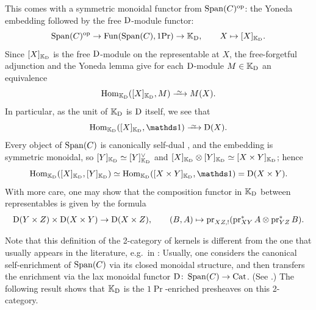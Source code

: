 \documentclass[11pt]{book}
\begin{document}
	This comes with a symmetric monoidal functor from $\operatorname{Span}(C)^{\textup{op}}$: the Yoneda embedding followed by the free $\operatorname{\mathrm{D}}$-module functor:
	\[
		\operatorname{Span}(C)^{\textup{op}} \to \operatorname{Fun}(\operatorname{Span}(C),1\textup{Pr}) \to \mathbb{K}_{\operatorname{\mathrm{D}}}, \qquad X \mapsto [X]_{\mathbb{K}_{\operatorname{\mathrm{D}}}}.
	\]
	Since $[X]_{\mathbb{K}_{\operatorname{\mathrm{D}}}}$ is the free $\operatorname{\mathrm{D}}$-module on the representable at $X$, the free-forgetful adjunction and the Yoneda lemma give for each $\operatorname{\mathrm{D}}$-module $M\in\mathbb{K}_{\operatorname{\mathrm{D}}}$ an equivalence
	\[
		\Hom_{\bbK_{\D}}([X]_{\bbK_{\D}}, M) \iso M(X).
	\]
	In particular, as the unit of $\mathbb{K}_{\operatorname{\mathrm{D}}}$ is $\operatorname{\mathrm{D}}$ itself, we see that
	\[
		\Hom_{\bbK_{\D}}([X]_{\bbK_{\D}}, \unit) \iso \D(X).
	\]
	Every object of $\operatorname{Span}(C)$ is canonically self-dual \citep[2.3.9]{Heyer_Mann}, and the embedding is symmetric monoidal, so $[Y]_{\mathbb{K}_{\operatorname{\mathrm{D}}}}\simeq[Y]_{\mathbb{K}_{\operatorname{\mathrm{D}}}}^{\vee}$ and $[X]_{\mathbb{K}_{\operatorname{\mathrm{D}}}}\otimes[Y]_{\mathbb{K}_{\operatorname{\mathrm{D}}}}\simeq[X\times Y]_{\mathbb{K}_{\operatorname{\mathrm{D}}}}$; hence
	\[
		\Hom_{\bbK_{\D}}([X]_{\bbK_{\D}}, [Y]_{\bbK_{\D}}) \simeq \Hom_{\bbK_{\D}}([X\times Y]_{\bbK_{\D}}, \unit) = \D(X\times Y).
	\]
	With more care, one may show that the composition functor in $\mathbb{K}_{\operatorname{\mathrm{D}}}$ between representables is given by the formula
	\[
		\operatorname{\mathrm{D}}(Y \times Z) \times \operatorname{\mathrm{D}}(X \times Y) \to \operatorname{\mathrm{D}}(X \times Z), \qquad (B, A) \mapsto \operatorname{pr}_{XZ,!}(\operatorname{pr}_{XY}^*A \otimes \operatorname{pr}_{YZ}^*B).
	\]

	Note that this definition of the 2-category of kernels is different from the one that usually appears in the literature, e.g.\ in \citep{Heyer_Mann}: Usually, one considers the canonical self-enrichment of $\operatorname{Span}(C)$ via its closed monoidal structure, and then transfers the enrichment via the lax monoidal functor $\operatorname{\mathrm{D}}\colon \operatorname{Span}(C) \to {\textup{Cat}}$. (See .) The following result shows that $\mathbb{K}_{\operatorname{\mathrm{D}}}$ is the $1\Pr$-enriched presheaves on this 2-category.
\end{document}
